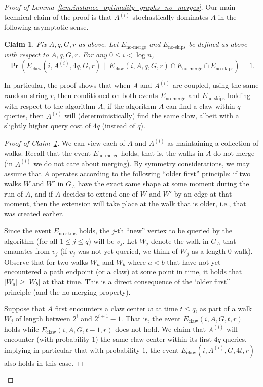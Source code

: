 \documentclass[11pt]{article}
\numberwithin{equation}{section}
\newtheorem{claim}[claim]{Claim}
\newcommand{\1}{\mathbf{1}}
\begin{document}
\begin{proof}[Proof of Lemma~\ref{lem:instance_optimality_graphs_no_merges}]
Our main technical claim of the proof is that $A^{(i)}$ stochastically dominates $A$ in the following asymptotic sense.
\begin{claim}
\label{claim:optimality_of_Ai}
Fix $A, q, G, r$ as above. Let $E_{\text{no-merge}}$ and $E_{\text{no-skips}}$ be defined as above with respect to $A,q,G,r$. 
For any $0 \leq i < \log n$, 
\begin{equation*}
\label{eqn:claw_stochastic_domination}
     \Pr(E_{\text{claw}}(i, A^{(i)},  4q, G, r) \ \ |\ \  E_{\text{claw}}(i, A, q, G, r) \cap E_{\text{no-merge}} \cap E_{\text{no-skips}}) = 1.
\end{equation*}
\end{claim}

In particular, the proof shows that when $A$ and $A^{(i)}$ are coupled, using the same random string $r$, then
conditioned on both events $E_{\text{no-merge}}$ and $E_{\text{no-skips}}$ holding with respect to the algorithm $A$, if the algorithm $A$ can find a claw within $q$ queries, then $A^{(i)}$ will (deterministically) find the same claw, albeit with a slightly higher query cost of $4q$ (instead of $q$).  

\begin{proof}[Proof of Claim~\ref{claim:optimality_of_Ai}] 


We can view each of $A$ and $A^{(i)}$ as maintaining a collection of walks. Recall that the event $E_{\text{no-merge}}$ holds, that is, the walks in $A$ do not merge (in $A^{(i)}$ we do not care about merging). By symmetry considerations, we may assume that $A$ operates according to the following ``older first'' principle:
if two walks $W$ and $W'$ in $G_{A}$ have the exact same shape at some moment during the run of $A$, and if $A$ decides to extend one of $W$ and $W'$ by an edge at that moment, then the extension will take place at the walk that is older, i.e., that was created earlier. 

Since the event $E_{\text{no-skips}}$ holds, the $j$-th ``new'' vertex to be queried by the algorithm (for all $1 \leq j \leq q$) will be $v_j$. Let $W_j$ denote the walk in $G_A$ that emanates from $v_j$ (if $v_j$ was not yet queried, we think of $W_j$ as a length-$0$ walk). Observe that for two walks $W_a$ and $W_b$ where $a < b$ that have not yet encountered a path endpoint (or a claw) at some point in time, it holds that $|W_a| \geq |W_b|$ at that time. This is a direct consequence of the `older first'' principle (and the no-merging property). 

Suppose that $A$ first encounters a claw center $w$ at time $t\leq q$, as part of a walk $W_j$ of length between $2^i$ and $2^{i+1}-1$. That is, the event $E_{\text{claw}}(i, A, G, t, r)$ holds while $E_{\text{claw}}(i, A, G, t-1, r)$ does not hold.
We claim that $A^{(i)}$ will encounter (with probability $1$) the same claw center within its first $4q$ queries, implying in particular that with probability $1$, the event $E_{\text{claw}}(i, A^{(i)}, G, 4t, r)$ also holds in this case.


\end{proof}
\end{proof}
\end{document}
